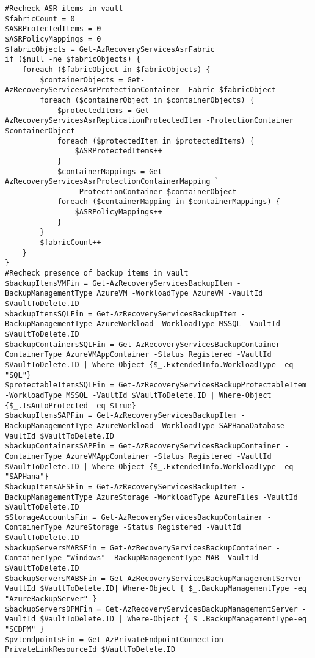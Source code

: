 \begin{verbatim}
#Recheck ASR items in vault
$fabricCount = 0
$ASRProtectedItems = 0
$ASRPolicyMappings = 0
$fabricObjects = Get-AzRecoveryServicesAsrFabric
if ($null -ne $fabricObjects) {
	foreach ($fabricObject in $fabricObjects) {
		$containerObjects = Get-AzRecoveryServicesAsrProtectionContainer -Fabric $fabricObject
		foreach ($containerObject in $containerObjects) {
			$protectedItems = Get-AzRecoveryServicesAsrReplicationProtectedItem -ProtectionContainer $containerObject
			foreach ($protectedItem in $protectedItems) {
				$ASRProtectedItems++
			}
			$containerMappings = Get-AzRecoveryServicesAsrProtectionContainerMapping `
				-ProtectionContainer $containerObject
			foreach ($containerMapping in $containerMappings) {
				$ASRPolicyMappings++
			}
		}
		$fabricCount++
	}
}
#Recheck presence of backup items in vault
$backupItemsVMFin = Get-AzRecoveryServicesBackupItem -BackupManagementType AzureVM -WorkloadType AzureVM -VaultId $VaultToDelete.ID
$backupItemsSQLFin = Get-AzRecoveryServicesBackupItem -BackupManagementType AzureWorkload -WorkloadType MSSQL -VaultId $VaultToDelete.ID
$backupContainersSQLFin = Get-AzRecoveryServicesBackupContainer -ContainerType AzureVMAppContainer -Status Registered -VaultId $VaultToDelete.ID | Where-Object {$_.ExtendedInfo.WorkloadType -eq "SQL"}
$protectableItemsSQLFin = Get-AzRecoveryServicesBackupProtectableItem -WorkloadType MSSQL -VaultId $VaultToDelete.ID | Where-Object {$_.IsAutoProtected -eq $true}
$backupItemsSAPFin = Get-AzRecoveryServicesBackupItem -BackupManagementType AzureWorkload -WorkloadType SAPHanaDatabase -VaultId $VaultToDelete.ID
$backupContainersSAPFin = Get-AzRecoveryServicesBackupContainer -ContainerType AzureVMAppContainer -Status Registered -VaultId $VaultToDelete.ID | Where-Object {$_.ExtendedInfo.WorkloadType -eq "SAPHana"}
$backupItemsAFSFin = Get-AzRecoveryServicesBackupItem -BackupManagementType AzureStorage -WorkloadType AzureFiles -VaultId $VaultToDelete.ID
$StorageAccountsFin = Get-AzRecoveryServicesBackupContainer -ContainerType AzureStorage -Status Registered -VaultId $VaultToDelete.ID
$backupServersMARSFin = Get-AzRecoveryServicesBackupContainer -ContainerType "Windows" -BackupManagementType MAB -VaultId $VaultToDelete.ID
$backupServersMABSFin = Get-AzRecoveryServicesBackupManagementServer -VaultId $VaultToDelete.ID| Where-Object { $_.BackupManagementType -eq "AzureBackupServer" }
$backupServersDPMFin = Get-AzRecoveryServicesBackupManagementServer -VaultId $VaultToDelete.ID | Where-Object { $_.BackupManagementType-eq "SCDPM" }
$pvtendpointsFin = Get-AzPrivateEndpointConnection -PrivateLinkResourceId $VaultToDelete.ID

\end{verbatim}
